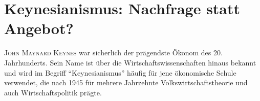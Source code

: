 %
%
%

\chapter{Keynesianismus: Nachfrage statt Angebot?}
\label{Keynes}

\textsc{John Maynard Keynes} war sicherlich der prägendste Ökonom des 20. Jahrhunderts. Sein Name ist über die Wirtschaftswissenschaften hinaus bekannt und wird im Begriff "`Keynesianismus"' häufig für jene ökonomische Schule verwendet, die nach 1945 für mehrere Jahrzehnte Volkswirtschaftstheorie und auch Wirtschaftspolitik prägte. 


